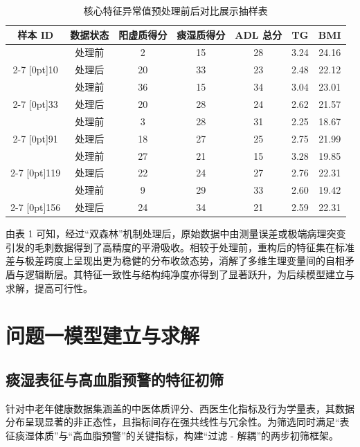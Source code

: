 \documentclass[12pt]{article}
\begin{document}
	\begin{table}[htbp]
		\centering
		\songti\small
		\caption{核心特征异常值预处理前后对比展示抽样表}
		\renewcommand{\arraystretch}{1.3} %
		\begin{tabular}{|c|c|c|c|c|c|c|}
			\hline
			样本 ID & 数据状态 & 阳虚质得分 & 痰湿质得分 & ADL 总分 & TG & BMI \\
			\hline
			& 处理前 & 2 & 15 & 28 & 3.24 & 24.16 \\
			\cline{2-7}
			\raisebox{1.5ex}[0pt]{10} & 处理后 & 20 & 33 & 23 & 2.48 & 22.12 \\
			\hline
			& 处理前 & 36 & 15 & 34 & 3.04 & 23.01 \\
			\cline{2-7}
			\raisebox{1.5ex}[0pt]{33} & 处理后 & 20 & 28 & 24 & 2.62 & 21.57 \\
			\hline
			& 处理前 & 3 & 28 & 31 & 2.25 & 18.67 \\
			\cline{2-7}
			\raisebox{1.5ex}[0pt]{91} & 处理后 & 18 & 27 & 25 & 2.75 & 21.99 \\
			\hline
			& 处理前 & 27 & 21 & 15 & 3.28 & 19.85 \\
			\cline{2-7}
			\raisebox{1.5ex}[0pt]{119} & 处理后 & 22 & 24 & 27 & 2.76 & 22.31 \\
			\hline
			& 处理前 & 9 & 29 & 33 & 2.60 & 19.42 \\
			\cline{2-7}
			\raisebox{1.5ex}[0pt]{156} & 处理后 & 24 & 34 & 21 & 2.59 & 22.31 \\
			\hline
		\end{tabular}
	\end{table}
	
	{\songti{}
		由表 1 可知，经过“双森林”机制处理后，原始数据中由测量误差或极端病理突变引发的毛刺数据得到了高精度的平滑吸收。相较于处理前，重构后的特征集在标准差与极差跨度上呈现出更为稳健的分布收敛态势，消解了多维生理变量间的自相矛盾与逻辑断层。其特征一致性与结构纯净度亦得到了显著跃升，为后续模型建立与求解，提高可行性。\par}
		
	\section{问题一模型建立与求解}
	\subsection{痰湿表征与高血脂预警的特征初筛}
	{\songti{}
		针对中老年健康数据集涵盖的中医体质评分、西医生化指标及行为学量表，其数据分布呈现显著的非正态性，且指标间存在强共线性与冗余性。为筛选同时满足“表征痰湿体质”与“高血脂预警”的关键指标，构建“过滤 - 解耦”的两步初筛框架。\par}
	
\end{document}
